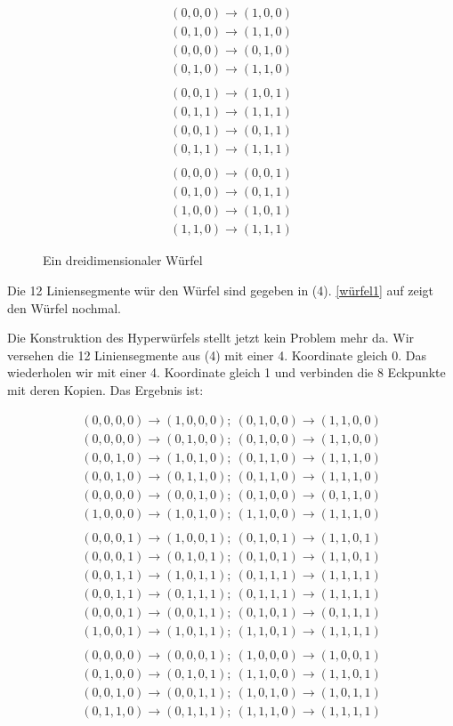 \documentclass[10pt,a4paper,twoside,titlepage]{article}
\newcommand{\myeq}[2]{
	\begin{equation}
		\begin{split}
			#1
		\end{split}
		\label{#2}
	\end{equation}
}
\newcommand{\psimg}[3]{
    \begin{figure}[!ht]
        \centering
        
        \caption{#2}
        #3
    \end{figure}
}
\begin{document}
\myeq{(0,0,0)\rightarrow(1,0,0)\\
	(0,1,0)\rightarrow(1,1,0)\\
	(0,0,0)\rightarrow(0,1,0)\\
	(0,1,0)\rightarrow(1,1,0)\\
	\\
	(0,0,1)\rightarrow(1,0,1)\\
	(0,1,1)\rightarrow(1,1,1)\\
	(0,0,1)\rightarrow(0,1,1)\\
	(0,1,1)\rightarrow(1,1,1)\\
	\\
	(0,0,0)\rightarrow(0,0,1)\\
	(0,1,0)\rightarrow(0,1,1)\\
	(1,0,0)\rightarrow(1,0,1)\\
	(1,1,0)\rightarrow(1,1,1)
}{würfel}

\psimg{img/wuerfel.tex}{Ein dreidimensionaler Würfel}{\label{würfel1}}

Die 12 Liniensegmente wür den Würfel sind gegeben in (4). \autoref{würfel1} auf
 zeigt den Würfel nochmal.

Die Konstruktion des Hyperwürfels stellt jetzt kein Problem mehr da. Wir
versehen die 12 Liniensegmente aus (4) mit einer 4. Koordinate gleich 0.
Das wiederholen wir mit einer 4. Koordinate gleich 1 und verbinden die 8
Eckpunkte mit deren Kopien. Das Ergebnis ist:

\myeq{(0,0,0,0)\rightarrow(1,0,0,0);\
	(0,1,0,0)\rightarrow(1,1,0,0)\\
	(0,0,0,0)\rightarrow(0,1,0,0);\
	(0,1,0,0)\rightarrow(1,1,0,0)\\
	(0,0,1,0)\rightarrow(1,0,1,0);\
	(0,1,1,0)\rightarrow(1,1,1,0)\\
	(0,0,1,0)\rightarrow(0,1,1,0);\
	(0,1,1,0)\rightarrow(1,1,1,0)\\
	(0,0,0,0)\rightarrow(0,0,1,0);\
	(0,1,0,0)\rightarrow(0,1,1,0)\\
	(1,0,0,0)\rightarrow(1,0,1,0);\
	(1,1,0,0)\rightarrow(1,1,1,0)\\
	\\
	(0,0,0,1)\rightarrow(1,0,0,1);\
	(0,1,0,1)\rightarrow(1,1,0,1)\\
	(0,0,0,1)\rightarrow(0,1,0,1);\
	(0,1,0,1)\rightarrow(1,1,0,1)\\
	(0,0,1,1)\rightarrow(1,0,1,1);\
	(0,1,1,1)\rightarrow(1,1,1,1)\\
	(0,0,1,1)\rightarrow(0,1,1,1);\
	(0,1,1,1)\rightarrow(1,1,1,1)\\
	(0,0,0,1)\rightarrow(0,0,1,1);\
	(0,1,0,1)\rightarrow(0,1,1,1)\\
	(1,0,0,1)\rightarrow(1,0,1,1);\
	(1,1,0,1)\rightarrow(1,1,1,1)\\
	\\
	(0,0,0,0)\rightarrow(0,0,0,1);\
	(1,0,0,0)\rightarrow(1,0,0,1)\\
	(0,1,0,0)\rightarrow(0,1,0,1);\
	(1,1,0,0)\rightarrow(1,1,0,1)\\
	(0,0,1,0)\rightarrow(0,0,1,1);\
	(1,0,1,0)\rightarrow(1,0,1,1)\\
	(0,1,1,0)\rightarrow(0,1,1,1);\
	(1,1,1,0)\rightarrow(1,1,1,1)
}{hyperw}
\end{document}
